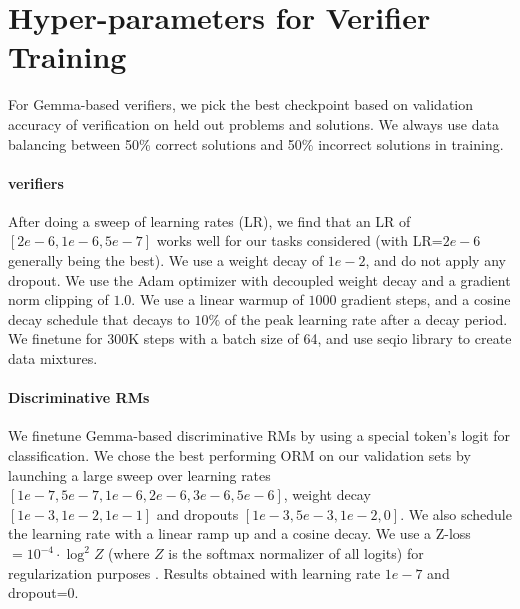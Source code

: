 \section{Hyper-parameters for Verifier Training}
\label{sec:hyper-parameter-gen-rm}

For Gemma-based verifiers, we pick the best checkpoint based on validation accuracy of verification on held out problems and solutions. We always use data balancing between 50\% correct solutions and 50\% incorrect solutions in training. 

\paragraph{{\genV} verifiers} After doing a sweep of learning rates (LR), we find that an LR of $[2e-6, 1e-6, 5e-7]$ works well for our tasks considered (with LR=$2e-6$ generally being the best). We use a weight decay of $1e-2$, and do not apply any dropout. We use the Adam optimizer \citep{adam} with decoupled weight decay \citep{loshchilov2017decoupled} and a gradient norm clipping of $1.0$. We use a linear warmup of $1000$ gradient steps, and a cosine decay schedule that decays to $10\%$ of the peak learning rate after a decay period. We finetune for 300K steps with a batch size of 64, and use seqio \citep{seqio} library to create data mixtures. 

\paragraph{Discriminative RMs} We finetune Gemma-based discriminative RMs by using a special token's logit for classification. We chose the best performing ORM on our validation sets by launching a large sweep over learning rates $[1e-7, 5e-7, 1e-6, 2e-6, 3e-6, 5e-6]$, weight decay $[1e-3, 1e-2, 1e-1]$ and dropouts $[1e-3, 5e-3, 1e-2, 0]$. We also schedule the learning rate with a linear ramp up and a cosine decay. We use a Z-loss $=10^{-4}\cdot \log^{2}Z$ (where $Z$ is the softmax normalizer of all logits) for regularization purposes \citep{chowdhery2023palm, wortsman2023small}. Results obtained with learning rate $1e-7$ and dropout=$0$.

